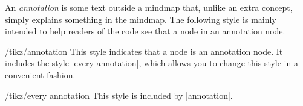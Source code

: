 An \emph{annotation} is some text outside a mindmap that, unlike an
extra concept, simply explains something in the mindmap. The following
style is mainly intended to help readers of the code see that a node
in an annotation node.

\begin{stylekey}{/tikz/annotation}
  This style indicates that a node is an annotation node. It includes
  the style |every annotation|, which allows you to change this style
  in a convenient fashion.
\begin{codeexample}[]

\end{codeexample}
  \begin{stylekey}{/tikz/every annotation}
    This style is included by |annotation|.
  \end{stylekey}
\end{stylekey}



